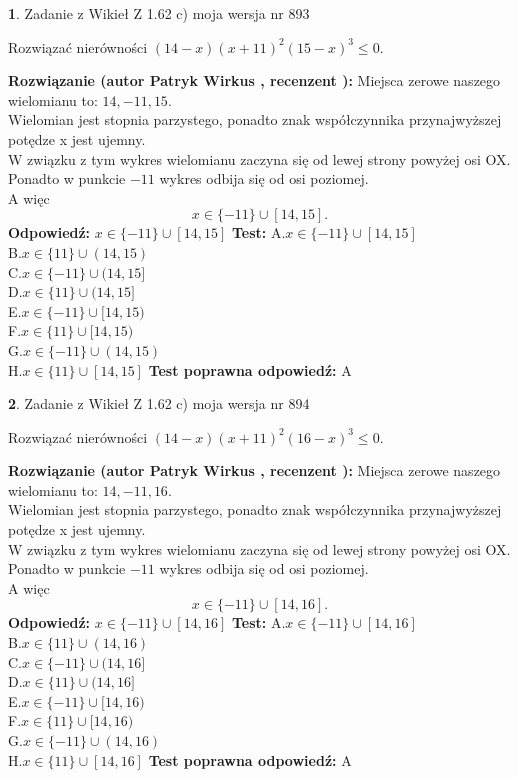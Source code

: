 \documentclass[12pt, a4paper]{article}
\theoremstyle{definition} %
\newtheorem{zad}{}
\newcommand{\zadStart}[1]{\begin{zad}#1\newline}
\newcommand{\zadStop}{\end{zad}}
\newcommand{\rozwStart}[2]{\noindent \textbf{Rozwiązanie (autor #1 , recenzent #2): }\newline}
\newcommand{\rozwStop}{\newline}
\newcommand{\odpStart}{\noindent \textbf{Odpowiedź:}\newline}
\newcommand{\odpStop}{\newline}
\newcommand{\testStart}{\noindent \textbf{Test:}\newline}
\newcommand{\testStop}{\newline}
\newcommand{\kluczStart}{\noindent \textbf{Test poprawna odpowiedź:}\newline}
\newcommand{\kluczStop}{\newline}
\begin{document}
\zadStart{Zadanie z Wikieł Z 1.62 c) moja wersja nr 893}

Rozwiązać nierówności $(14-x)(x+11)^{2}(15-x)^{3}\le0$.
\zadStop
\rozwStart{Patryk Wirkus}{}
Miejsca zerowe naszego wielomianu to: $14, -11, 15$.\\
Wielomian jest stopnia parzystego, ponadto znak współczynnika przy\linebreak najwyższej potędze x jest ujemny.\\ W związku z tym wykres wielomianu zaczyna się od lewej strony powyżej osi OX.\\
Ponadto w punkcie $-11$ wykres odbija się od osi poziomej.\\
A więc $$x \in \{-11\} \cup [14,15].$$
\rozwStop
\odpStart
$x \in \{-11\} \cup [14,15]$
\odpStop
\testStart
A.$x \in \{-11\} \cup [14,15]$\\
B.$x \in \{11\} \cup (14,15)$\\
C.$x \in \{-11\} \cup (14,15]$\\
D.$x \in \{11\} \cup (14,15]$\\
E.$x \in \{-11\} \cup [14,15)$\\
F.$x \in \{11\} \cup [14,15)$\\
G.$x \in \{-11\} \cup (14,15)$\\
H.$x \in \{11\} \cup [14,15]$
\testStop
\kluczStart
A
\kluczStop



\zadStart{Zadanie z Wikieł Z 1.62 c) moja wersja nr 894}

Rozwiązać nierówności $(14-x)(x+11)^{2}(16-x)^{3}\le0$.
\zadStop
\rozwStart{Patryk Wirkus}{}
Miejsca zerowe naszego wielomianu to: $14, -11, 16$.\\
Wielomian jest stopnia parzystego, ponadto znak współczynnika przy\linebreak najwyższej potędze x jest ujemny.\\ W związku z tym wykres wielomianu zaczyna się od lewej strony powyżej osi OX.\\
Ponadto w punkcie $-11$ wykres odbija się od osi poziomej.\\
A więc $$x \in \{-11\} \cup [14,16].$$
\rozwStop
\odpStart
$x \in \{-11\} \cup [14,16]$
\odpStop
\testStart
A.$x \in \{-11\} \cup [14,16]$\\
B.$x \in \{11\} \cup (14,16)$\\
C.$x \in \{-11\} \cup (14,16]$\\
D.$x \in \{11\} \cup (14,16]$\\
E.$x \in \{-11\} \cup [14,16)$\\
F.$x \in \{11\} \cup [14,16)$\\
G.$x \in \{-11\} \cup (14,16)$\\
H.$x \in \{11\} \cup [14,16]$
\testStop
\kluczStart
A
\kluczStop
\end{document}
